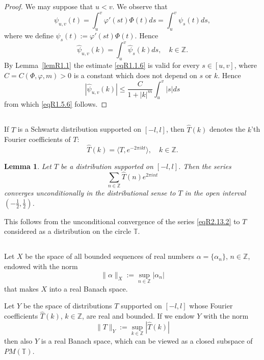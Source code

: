 \documentclass[reqno,a4paper,12pt]{amsart}
\numberwithin{equation}{section}
\numberwithin{figure}{section}
\newcommand\Z{\mathbb{Z}}
\newcommand\T{\mathbb{T}}
\newcommand\1{\mathds{1}}
\renewcommand\leq{\leqslant}
\newcommand{\ft}[1]{\widehat{#1}}
\newcommand{\dotprod}[2]{\langle #1 , #2 \rangle}
\newcommand{\half}{\tfrac{1}{2}}
\theoremstyle{plain}
\newtheorem{lem}[thm]{Lemma}
\newcommand{\lemref}[1]{Lemma~\ref{#1}}
\theoremstyle{definition}
\begin{document}
\begin{proof}
We may suppose that $u<v$. We observe that
\begin{equation}
\label{eqR1.5.1}
\psi_{u,v}(t) = \int_u^v \varphi'(st) \Phi(t) ds
= \int_u^v \psi_s(t) ds,
\end{equation}
where we define $\psi_s(t) := \varphi'(st) \Phi(t)$. Hence
\begin{equation}
\label{eqR1.5.2}
\ft{\psi}_{u,v}(k) =  \int_u^v \ft{\psi}_s(k) ds,
\quad k \in \Z.
\end{equation}
By \lemref{lemR1.1} the estimate
\eqref{eqR1.1.6} is valid for every $s \in [u,v]$,
where $C = C(\Phi, \varphi, m)>0$ is a constant 
 which does not depend on $s$ or $k$. Hence
\begin{equation}
\label{eqR1.5.3}
|\ft{\psi}_{u,v}(k)| \leq  \frac{C}{1+|k|^m}
\int_u^v |s| ds
\end{equation}
from which \eqref{eqR1.5.6} follows.
\end{proof}


\subsection{}
If $T$ is a Schwartz distribution 
supported on $[-l,l]$, then $\ft{T}(k)$ denotes the
 $k$'th Fourier coefficients of $T$:
\[
\ft{T}(k) = \dotprod{T}{ e^{-2\pi i k t}},
\quad k \in \Z.
\]

\begin{lem}
  \label{lemR2.13}
Let $T$ be a distribution 
supported on $[-l,l]$. Then the series
\begin{equation}
\label{eqR2.13.2}
\sum_{n \in \Z} \ft{T}(n) e^{2 \pi i n t}
\end{equation}
converges unconditionally in the distributional sense
to $T$ in the open interval $(-\half, \half)$.
\end{lem}

This follows from the unconditional convergence of the series
\eqref{eqR2.13.2} to $T$ considered
as a distribution on the circle $\T$.


\subsection{}
Let $X$ be the space of all bounded sequences of real numbers
$\alpha = \{\alpha_n\}$,  $n \in \Z$,
endowed with the norm
\[
\|\alpha\|_X := \sup_{n \in \Z} |\alpha_n|
\]
that makes $X$ into a real Banach space.


Let $Y$ be the space of distributions $T$
supported on $[-l,l]$ whose  Fourier coefficients
$\ft{T}(k)$, $k \in \Z$,
are real and bounded. If we endow $Y$ with the norm
\begin{equation}
\label{eqR2.7.12}
\|T\|_Y := \sup_{k \in \Z} |\ft{T}(k)|
\end{equation}
then also $Y$ is a real Banach space,
which can be viewed as a closed subspace
of $PM(\T)$.
\end{document}
